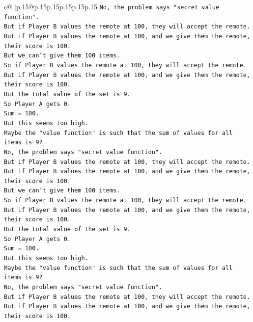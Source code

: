 \documentclass{article}
\begin{document}
{\begin{supertabular}{c@{$\;$}|p{.15\linewidth}@{}p{.15\linewidth}p{.15\linewidth}p{.15\linewidth}p{.15\linewidth}p{.15\linewidth}}
{{{\texttt{No, the problem says "secret value function".} \\
\texttt{But if Player B values the remote at 100, they will accept the remote.} \\
\texttt{But if Player B values the remote at 100, and we give them the remote, their score is 100.} \\
\texttt{But we can't give them 100 items.} \\
\texttt{So if Player B values the remote at 100, they will accept the remote.} \\
\texttt{But if Player B values the remote at 100, and we give them the remote, their score is 100.} \\
\texttt{But the total value of the set is 9.} \\
\texttt{So Player A gets 0.} \\
\texttt{Sum = 100.} \\
\texttt{But this seems too high.} \\
\texttt{Maybe the "value function" is such that the sum of values for all items is 9?} \\
\texttt{No, the problem says "secret value function".} \\
\texttt{But if Player B values the remote at 100, they will accept the remote.} \\
\texttt{But if Player B values the remote at 100, and we give them the remote, their score is 100.} \\
\texttt{But we can't give them 100 items.} \\
\texttt{So if Player B values the remote at 100, they will accept the remote.} \\
\texttt{But if Player B values the remote at 100, and we give them the remote, their score is 100.} \\
\texttt{But the total value of the set is 9.} \\
\texttt{So Player A gets 0.} \\
\texttt{Sum = 100.} \\
\texttt{But this seems too high.} \\
\texttt{Maybe the "value function" is such that the sum of values for all items is 9?} \\
\texttt{No, the problem says "secret value function".} \\
\texttt{But if Player B values the remote at 100, they will accept the remote.} \\
\texttt{But if Player B values the remote at 100, and we give them the remote, their score is 100.} \\
}}}
\end{supertabular}}
\end{document}
